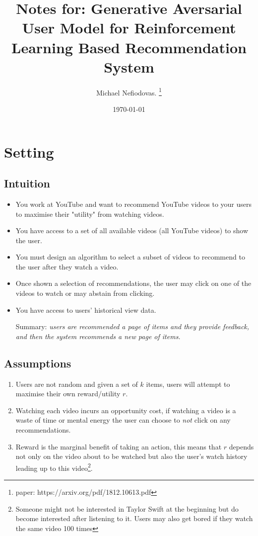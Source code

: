 \documentclass{article}
\title{Notes for: Generative Aversarial User Model for Reinforcement Learning Based Recommendation System}
\author{Michael Nefiodovas. \thanks{paper: https://arxiv.org/pdf/1812.10613.pdf}}
\date{\today}
\begin{document}
    \maketitle

    \section{Setting}

    \subsection{Intuition}
    \begin{itemize}
        \item You work at YouTube and want to recommend YouTube videos to your users to maximise their "utility" from watching videos.
        \item You have access to a set of all available videos (all YouTube videos) to show the user.
        \item You must design an algorithm to select a subset of videos to recommend to the user after they watch a video.
        \item Once shown a selection of recommendations, the user may click on one of the videos to watch or may abstain from clicking.
        \item You have access to users' historical view data.
        \item[Summary:] \emph{users are recommended a page of items and they provide feedback, and then the system recommends a new page of items.}
    \end{itemize}

    \subsection{Assumptions}
    \begin{enumerate}
        \item Users are not random and given a set of $k$ items, users will attempt to maximise their own reward/utility $r$.
        \item Watching each video incurs an opportunity cost, if watching a video is a waste of time or mental energy the user can choose to \emph{not} click on any recommendations.
        \item Reward is the marginal benefit of taking an action, this means that $r$ depends not only on the video about to be watched but also the user's watch history leading up to this video\footnote{Someone might not be interested in Taylor Swift at the beginning but do become interested after listening to it. Users may also get bored if they watch the same video 100 times}.
    \end{enumerate}
\end{document}
